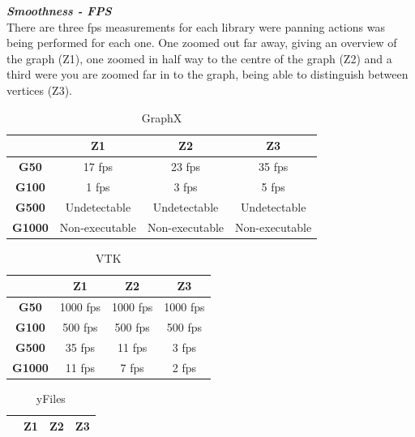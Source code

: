 \documentclass[a4paper,11pt]{kth-mag}
\begin{document}
\begin{appendices}
\newline
\textbf{\textit{Smoothness - FPS}}\\
\newline
There are three fps measurements for each library were panning actions was being performed for each one. One zoomed out far away, giving an overview of the
graph (Z1), one zoomed in half way to the centre of the graph (Z2) and a third were you are zoomed far in to the graph, being able to distinguish between vertices (Z3).\\
\newline
\begin{table}[h]
\centering
\caption{GraphX}
\begin{tabular}{|c|c|c|c|}
\hline
\multicolumn{1}{|l|}{} & \textbf{Z1}    & \textbf{Z2}    & \textbf{Z3}    \\ \hline
\textbf{G50}           & 17 fps         & 23 fps         & 35 fps         \\ \hline
\textbf{G100}          & 1 fps          & 3 fps          & 5 fps          \\ \hline
\textbf{G500}          & Undetectable   & Undetectable   & Undetectable   \\ \hline
\textbf{G1000}         & Non-executable & Non-executable & Non-executable \\ \hline
\end{tabular}
\label{table-graphx:appendix}
\end{table}
\newline
\begin{table}[h]
\centering
\caption{VTK}
\begin{tabular}{|c|c|c|c|}
\hline
\textbf{}      & \textbf{Z1} & \textbf{Z2} & \textbf{Z3} \\ \hline
\textbf{G50}   & 1000 fps    & 1000 fps    & 1000 fps    \\ \hline
\textbf{G100}  & 500 fps     & 500 fps     & 500 fps     \\ \hline
\textbf{G500}  & 35 fps      & 11 fps      & 3 fps       \\ \hline
\textbf{G1000} & 11 fps      & 7 fps       & 2 fps       \\ \hline
\end{tabular}
\label{table-VTK:appendix}
\end{table}
\newline
\begin{table}[h]
\centering
\caption{yFiles}
\begin{tabular}{|c|c|c|c|}
\hline
\textbf{}      & \textbf{Z1}  & \textbf{Z2}  & \textbf{Z3}  \\ \hline

\end{tabular}
\end{table}
\end{appendices}
\end{document}

